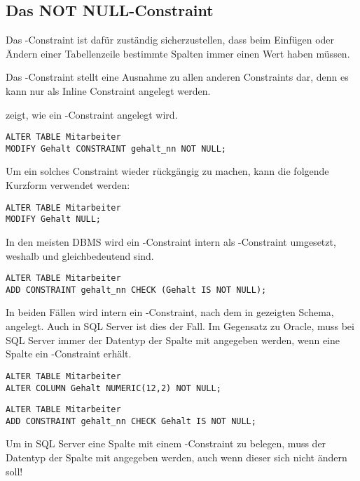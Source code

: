      \subsection{Das NOT NULL-Constraint}
        Das \NOTNULL-Constraint ist daf\"ur zust\"andig sicherzustellen, dass beim Einf\"ugen oder \"Andern einer Tabellenzeile bestimmte Spalten immer einen Wert haben m\"ussen.
        \begin{merke}
          Das \NOTNULL-Constraint stellt eine Ausnahme zu allen anderen Constraints dar, denn es kann nur als Inline Constraint angelegt werden.
        \end{merke}
         zeigt, wie ein \NOTNULL-Constraint angelegt wird.
        \begin{lstlisting}[language=oracle_sql,caption={Ein \NOTNULL-Constraint anlegen in Oracle},label=sql09_05]
ALTER TABLE Mitarbeiter
MODIFY Gehalt CONSTRAINT gehalt_nn NOT NULL;
        \end{lstlisting}
        Um ein solches Constraint wieder r\"uckg\"angig zu machen, kann die folgende Kurzform verwendet werden:
        \begin{lstlisting}[language=oracle_sql,caption={Das Gegenteil von \NOTNULL},label=sql09_06]
ALTER TABLE Mitarbeiter
MODIFY Gehalt NULL;
        \end{lstlisting}
        In den meisten DBMS wird ein \NOTNULL-Constraint intern als
\CHECK-Constraint umgesetzt, weshalb  und
 gleichbedeutend sind.
        \begin{lstlisting}[language=oracle_sql,caption={Die alternative Form eines \NOTNULL-Constraints in Oracle},label=sql09_07]
ALTER TABLE Mitarbeiter
ADD CONSTRAINT gehalt_nn CHECK (Gehalt IS NOT NULL);
        \end{lstlisting}
        In beiden F\"allen wird intern ein \CHECK-Constraint, nach dem in  gezeigten Schema, angelegt. Auch in SQL Server ist dies der Fall. Im Gegensatz zu Oracle, muss bei SQL Server immer der Datentyp der Spalte mit angegeben werden, wenn eine Spalte ein \NOTNULL-Constraint erh\"alt.
        \begin{lstlisting}[language=ms_sql,caption={Ein \NOTNULL{} Constraint
anlegen in SQL Server},label=sql09_08]
ALTER TABLE Mitarbeiter
ALTER COLUMN Gehalt NUMERIC(12,2) NOT NULL;
        \end{lstlisting}
        \begin{lstlisting}[language=ms_sql,caption={Die alternative Form eines
\NOTNULL{} Constraints in SQL Server},label=sql09_09]
ALTER TABLE Mitarbeiter
ADD CONSTRAINT gehalt_nn CHECK Gehalt IS NOT NULL;
        \end{lstlisting}
        \begin{merke}
          Um in SQL Server eine Spalte mit einem \NOTNULL-Constraint zu belegen, muss der Datentyp der Spalte mit angegeben werden, auch wenn dieser sich nicht \"andern soll!
        \end{merke}
